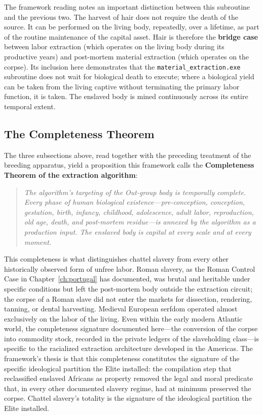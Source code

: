 The framework reading notes an important distinction between this subroutine and the previous two. The harvest of hair does not require the death of the source. It can be performed on the living body, repeatedly, over a lifetime, as part of the routine maintenance of the capital asset. Hair is therefore the \textbf{bridge case} between labor extraction (which operates on the living body during its productive years) and post-mortem material extraction (which operates on the corpse). Its inclusion here demonstrates that the \texttt{material\_extraction.exe} subroutine does not wait for biological death to execute; where a biological yield can be taken from the living captive without terminating the primary labor function, it is taken. The enslaved body is mined continuously across its entire temporal extent.

\subsection{The Completeness Theorem}
\label{subsec:completeness_theorem}

The three subsections above, read together with the preceding treatment of the breeding apparatus, yield a proposition this framework calls the \textbf{Completeness Theorem of the extraction algorithm}:

\begin{quote}
\textit{The algorithm's targeting of the Out-group body is temporally complete. Every phase of human biological existence---pre-conception, conception, gestation, birth, infancy, childhood, adolescence, adult labor, reproduction, old age, death, and post-mortem residue---is annexed by the algorithm as a production input. The enslaved body is capital at every scale and at every moment.}
\end{quote}

This completeness is what distinguishes chattel slavery from every other historically observed form of unfree labor. Roman slavery, as the Roman Control Case in Chapter~\ref{ch:portugal} has documented, was brutal and heritable under specific conditions but left the post-mortem body outside the extraction circuit; the corpse of a Roman slave did not enter the markets for dissection, rendering, tanning, or dental harvesting. Medieval European serfdom operated almost exclusively on the labor of the living. Even within the early modern Atlantic world, the completeness signature documented here---the conversion of the corpse into commodity stock, recorded in the private ledgers of the slaveholding class---is specific to the racialized extraction architecture developed in the Americas. The framework's thesis is that this completeness constitutes the signature of the specific ideological partition the Elite installed: the compilation step that reclassified enslaved Africans as property removed the legal and moral predicate that, in every other documented slavery regime, had at minimum preserved the corpse. Chattel slavery's totality is the signature of the ideological partition the Elite installed.

